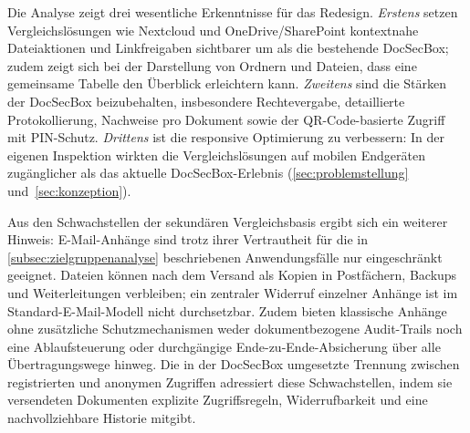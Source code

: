 Die Analyse zeigt drei wesentliche Erkenntnisse für das Redesign. \emph{Erstens} setzen Vergleichslösungen wie Nextcloud und OneDrive/SharePoint kontextnahe Dateiaktionen und Linkfreigaben sichtbarer um als die bestehende DocSecBox; zudem zeigt sich bei der Darstellung von Ordnern und Dateien, dass eine gemeinsame Tabelle den Überblick erleichtern kann. \emph{Zweitens} sind die Stärken der DocSecBox beizubehalten, insbesondere Rechtevergabe, detaillierte Protokollierung, Nachweise pro Dokument sowie der QR-Code-basierte Zugriff mit PIN-Schutz. \emph{Drittens} ist die responsive Optimierung zu verbessern: In der eigenen Inspektion wirkten die Vergleichslösungen auf mobilen Endgeräten zugänglicher als das aktuelle DocSecBox-Erlebnis (\autoref{sec:problemstellung} und~\autoref{sec:konzeption}).

Aus den Schwachstellen der sekundären Vergleichsbasis ergibt sich ein weiterer Hinweis: E-Mail-Anhänge sind trotz ihrer Vertrautheit für die in \autoref{subsec:zielgruppenanalyse} beschriebenen Anwendungsfälle nur eingeschränkt geeignet. Dateien können nach dem Versand als Kopien in Postfächern, Backups und Weiterleitungen verbleiben; ein zentraler Widerruf einzelner Anhänge ist im Standard-E-Mail-Modell nicht durchsetzbar. Zudem bieten klassische Anhänge ohne zusätzliche Schutzmechanismen weder dokumentbezogene Audit-Trails noch eine Ablaufsteuerung oder durchgängige Ende-zu-Ende-Absicherung über alle Übertragungswege hinweg. Die in der DocSecBox umgesetzte Trennung zwischen registrierten und anonymen Zugriffen adressiert diese Schwachstellen, indem sie versendeten Dokumenten explizite Zugriffsregeln, Widerrufbarkeit und eine nachvollziehbare Historie mitgibt.
